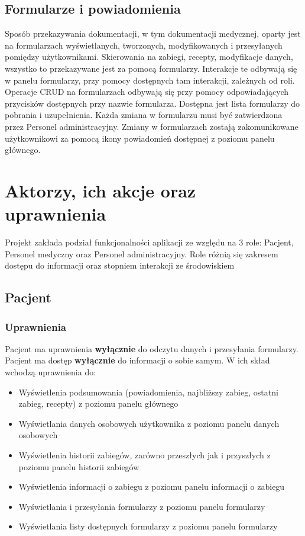 \subsection{Formularze i powiadomienia}
Sposób przekazywania dokumentacji, w tym dokumentacji medycznej, oparty jest na formularzach wyświetlanych, tworzonych, modyfikowanych i przesyłanych pomiędzy użytkownikami. Skierowania na zabiegi, recepty, modyfikacje danych, wszystko to przekazywane jest za pomocą formularzy. Interakcje te odbywają się w panelu formularzy, przy pomocy dostępnych tam interakcji, zależnych od roli. Operacje CRUD na formularzach odbywają się przy pomocy odpowiadających przycisków dostępnych przy nazwie formularza. Dostępna jest lista formularzy do pobrania i uzupełnienia. Każda zmiana w formularzu musi być zatwierdzona przez Personel administracyjny. Zmiany w formularzach zostają zakomunikowane użytkownikowi za pomocą ikony powiadomień dostępnej z poziomu panelu głównego.

\section{Aktorzy, ich akcje oraz uprawnienia}
Projekt zakłada podział funkcjonalności aplikacji ze względu na 3 role: Pacjent, Personel medyczny oraz Personel administracyjny. Role różnią się zakresem dostępu do informacji oraz stopniem interakcji ze środowiskiem
\subsection{Pacjent}
\subsubsection{Uprawnienia}
Pacjent ma uprawnienia \textbf{wyłącznie} do odczytu danych i przesyłania formularzy. Pacjent ma dostęp \textbf{wyłącznie} do informacji o sobie samym. W ich skład wchodzą uprawnienia do:\begin{itemize}
    \item Wyświetlenia podsumowania (powiadomienia, najbliższy zabieg, ostatni zabieg, recepty) z poziomu panelu głównego
    \item Wyświetlania danych osobowych użytkownika z poziomu panelu danych osobowych
    \item Wyświetlenia historii zabiegów, zarówno przeszłych jak i przyszłych z poziomu panelu historii zabiegów
    \item Wyświetlenia informacji o zabiegu z poziomu panelu informacji o zabiegu
    \item Wyświetlania i przesyłania formularzy z poziomu panelu formularzy
    \item Wyświetlania listy dostępnych formularzy z poziomu panelu formularzy
\end{itemize}
